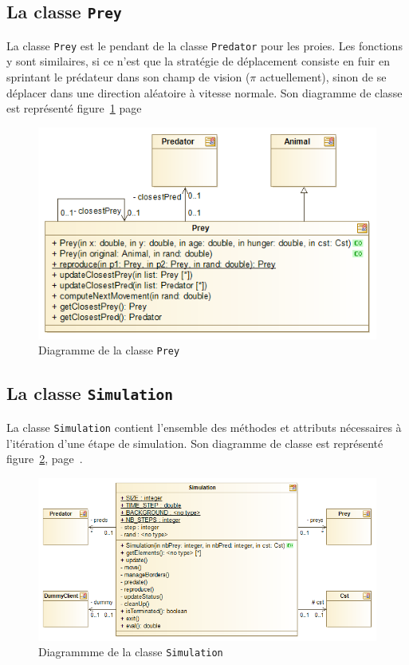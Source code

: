 \documentclass[12pt,a4paper,titlepage]{article}
\begin{document}
\subsection{La classe \texttt{Prey}}
\FloatBarrier
La classe \texttt{Prey} est le pendant de la classe \texttt{Predator} pour les proies. Les fonctions y sont similaires, si ce n'est que la stratégie de déplacement consiste en fuir en sprintant le prédateur dans son champ de vision ($\pi$ actuellement), sinon de se déplacer dans une direction aléatoire à vitesse normale.
Son diagramme de classe est représenté figure~\ref{prey} page~\pageref{prey}
\begin{figure}[h]
\includegraphics[width = \textwidth]{"../diagrammes/prey"}
\caption{Diagramme de la classe \texttt{Prey} }
\label{prey}
\end{figure}
\FloatBarrier
\subsection{La classe \texttt{Simulation}}
\FloatBarrier
La classe \texttt{Simulation} contient l'ensemble des méthodes et attributs nécessaires à l'itération d'une étape de simulation. Son diagramme de classe est représenté figure~\ref{simulation}, page~\pageref{simulation}.

\begin{figure}[h]
\includegraphics[width = \textwidth]{"../diagrammes/simulation"}
\caption{Diagrammme de la classe \texttt{Simulation}}
\label{simulation}
\end{figure}
\end{document}
